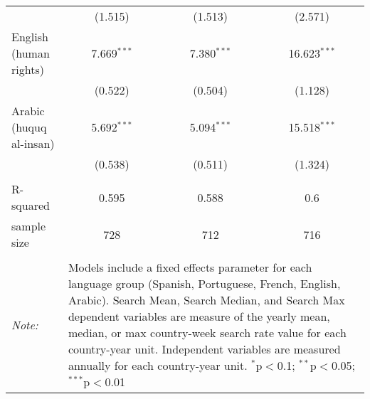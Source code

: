 \begin{table}[!htbp]
\begin{tabular}{@{\extracolsep{5pt}}lccc}
  & (1.515) & (1.513) & (2.571) \\ 
  English (human rights) & 7.669$^{***}$ & 7.380$^{***}$ & 16.623$^{***}$ \\ 
  & (0.522) & (0.504) & (1.128) \\ 
  Arabic (huquq al-insan) & 5.692$^{***}$ & 5.094$^{***}$ & 15.518$^{***}$ \\ 
  & (0.538) & (0.511) & (1.324) \\ 
 \hline \\[-1.8ex] 
R-squared  & 0.595 & 0.588 & 0.6 \\ 
sample size  & 728 & 712 & 716 \\ 
\hline 
\hline \\[-1.8ex] 
\textit{Note:}  & \multicolumn{3}{l}{\parbox[t]{8cm}{Models include a fixed effects parameter for each language group (Spanish, Portuguese, French, English, Arabic). Search Mean, Search Median, and Search Max dependent variables are measure of the yearly mean, median, or max country-week search rate value for each country-year unit. Independent variables are measured annually for each country-year unit. $^{*}$p$<$0.1; $^{**}$p$<$0.05; $^{***}$p$<$0.01}} \\ 
\end{tabular} 
\end{table} 
